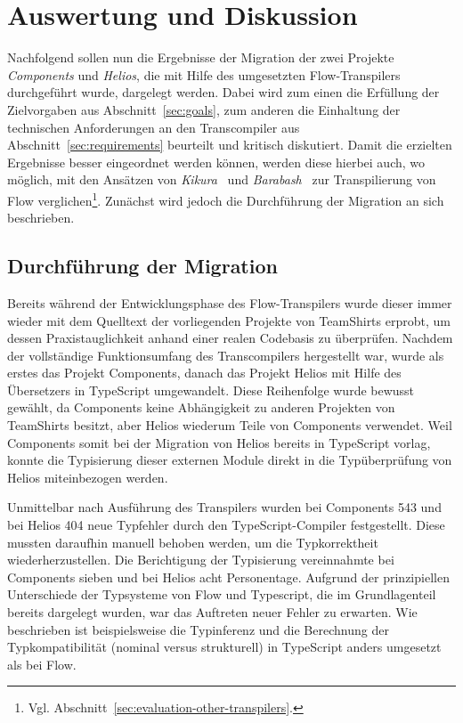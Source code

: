 \chapter{Auswertung und Diskussion}
\label{chap:evaluation}

Nachfolgend sollen nun die Ergebnisse der Migration der zwei Projekte \textit{Components} und \textit{Helios}, die mit Hilfe des umgesetzten Flow-Transpilers durchgeführt wurde, dargelegt werden. Dabei wird zum einen die Erfüllung der Zielvorgaben aus Abschnitt~\ref{sec:goals}, zum anderen die Einhaltung der technischen Anforderungen an den Transcompiler aus Abschnitt~\ref{sec:requirements} beurteilt und kritisch diskutiert. Damit die erzielten Ergebnisse besser eingeordnet werden können, werden diese hierbei auch, wo möglich, mit den Ansätzen von \textit{Kikura}~\autocite{KIKURA:FLOW_TO_TS} und \textit{Barabash}~\autocite{BARABASH:FLOW_TO_TS} zur Transpilierung von Flow verglichen\footnote{Vgl. Abschnitt~\ref{sec:evaluation-other-transpilers}.}. Zunächst wird jedoch die Durchführung der Migration an sich beschrieben.

\section{Durchführung der Migration}

Bereits während der Entwicklungsphase des Flow-Transpilers wurde dieser immer wieder mit dem Quelltext der vorliegenden Projekte von TeamShirts erprobt, um dessen Praxistauglichkeit anhand einer realen Codebasis zu überprüfen. Nachdem der vollständige Funktionsumfang des Transcompilers hergestellt war, wurde als erstes das Projekt Components, danach das Projekt Helios mit Hilfe des Übersetzers in TypeScript umgewandelt. Diese Reihenfolge wurde bewusst gewählt, da Components keine Abhängigkeit zu anderen Projekten von TeamShirts besitzt, aber Helios wiederum Teile von Components verwendet. Weil Components somit bei der Migration von Helios bereits in TypeScript vorlag, konnte die Typisierung dieser externen Module direkt in die Typüberprüfung von Helios miteinbezogen werden.

Unmittelbar nach Ausführung des Transpilers wurden bei Components 543 und bei Helios 404 neue Typfehler durch den TypeScript-Compiler festgestellt. Diese mussten daraufhin manuell behoben werden, um die Typkorrektheit wiederherzustellen. Die Berichtigung der Typisierung vereinnahmte bei Components sieben und bei Helios acht Personentage. Aufgrund der prinzipiellen Unterschiede der Typsysteme von Flow und Typescript, die im Grundlagenteil bereits dargelegt wurden, war das Auftreten neuer Fehler zu erwarten. Wie beschrieben ist beispielsweise die Typinferenz und die Berechnung der Typkompatibilität (nominal versus strukturell) in TypeScript anders umgesetzt als bei Flow.

